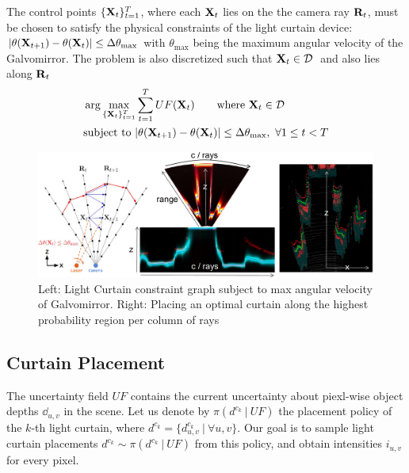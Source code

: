 The control points $\{\mathbf{X}_t\}_{t=1}^T$, where each $\mathbf{X}_t$ lies on the the camera ray $\mathbf{R}_t$, must be chosen to satisfy the physical constraints of the light curtain device: $|\theta(\mathbf{X}_{t+1}) - \theta(\mathbf{X}_t)| \leq \Delta \theta_\text{max}$ with $\theta_\text{max}$ being the maximum angular velocity of the Galvomirror. The problem is also discretized such that $\X_{t} \in \D\ $ and also lies along $\mathbf{R}_t$
\begin{align}
    &\arg \max_{\{\mathbf{X}_t\}_{t=1}^T} \sum_{t=1}^T UF(\mathbf{X}_t) \qquad \text{where}\ \mathbf{X}_t \in \mathcal{D}\ \nonumber\\
    &\text{subject to}\ |\theta(\mathbf{X}_{t+1}) - \theta(\mathbf{X}_t)| \leq \Delta \theta_\text{max},\ \forall 1 \leq t < T
    \label{eq:constraint}
\end{align}

\begin{figure}[h]
   \centering
   \begin{minipage}{0.5\textwidth}
       \centering
       \includegraphics[width=1.0\textwidth]{figures/planner.pdf}
   \end{minipage}\hfill
   \centering
   \caption{Left: Light Curtain constraint graph subject to max angular velocity of Galvomirror. Right: Placing an optimal curtain along the highest probability region per column of rays}
   \label{fig:plannerfig}
\end{figure}

\subsection{Curtain Placement}

The uncertainty field $UF$ contains the current uncertainty about piexl-wise object depths $\dd_{u, v}$ in the scene. Let us denote by $\pi(d^{c_k}\ |\ UF)$ the placement policy of the $k$-th light curtain, where $d^{c_k} = \{d^{c_k}_{u, v}\ |\ \forall u, v\}$. Our goal is to sample light curtain placements $d^{c_k} \sim \pi(d^{c_k}\ |\ UF)$ from this policy, and obtain intensities $i_{u, v}$ for every pixel.

